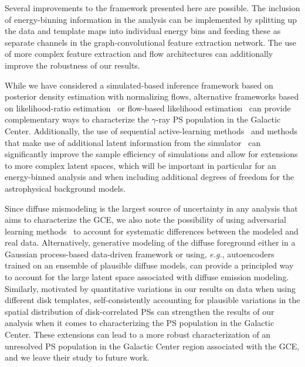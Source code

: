 \documentclass[prd,aps,10pt,nofootinbib,twocolumn,superscriptaddress,preprintnumbers,balancelastpage,longbibliography]{revtex4-1}
\begin{document}
Several improvements to the framework presented here are possible. The inclusion of energy-binning information in the analysis can be implemented by splitting up the data and template maps into individual energy bins and feeding these as separate channels in the graph-convolutional feature extraction network. The use of more complex feature extraction and flow architectures can additionally improve the robustness of our results. 

While we have considered a simulated-based inference framework based on posterior density estimation with normalizing flows, alternative frameworks based on likelihood-ratio estimation~\cite{Brehmer:2018eca,Brehmer:2018hga,Brehmer:2018kdj,Cranmer:2015bka, Hermans:2019ioj,Miller:2020hua,Miller:2021hys} or flow-based likelihood estimation~\cite{winkler2019learning,papamakarios2019sequential} can provide complementary ways to characterize the $\gamma$-ray PS population in the Galactic Center. Additionally, the use of sequential active-learning methods~\cite{papamakarios2019sequential} and methods that make use of additional latent information from the simulator~\cite{Brehmer:2018eca,Brehmer:2018hga,Brehmer:2018kdj,Brehmer:2019xox,Stoye:2018ovl} can significantly improve the sample efficiency of simulations and allow for extensions to more complex latent spaces, which will be important in particular for an energy-binned analysis and when including additional degrees of freedom for the astrophysical background models. 

Since diffuse mismodeling is the largest source of uncertainty in any analysis that aims to characterize the GCE, we also note the possibility of using adversarial learning methods~\cite{Louppe:2016ylz} to account for systematic differences between the modeled and real \Fermi data. Alternatively, generative modeling of the diffuse foreground either in a Gaussian process-based data-driven framework or using, \emph{e.g.}, autoencoders trained on an ensemble of plausible diffuse models, can provide a principled way to account for the large latent space associated with diffuse emission modeling. Similarly, motivated by quantitative variations in our results on \Fermi data when using different disk templates, self-consistently accounting for plausible variations in the spatial distribution of disk-correlated PSs can strengthen the results of our analysis when it comes to characterizing the PS population in the Galactic Center. 
These extensions can lead to a more robust characterization of an unresolved PS population in the Galactic Center region associated with the GCE, and we leave their study to future work.
\end{document}
